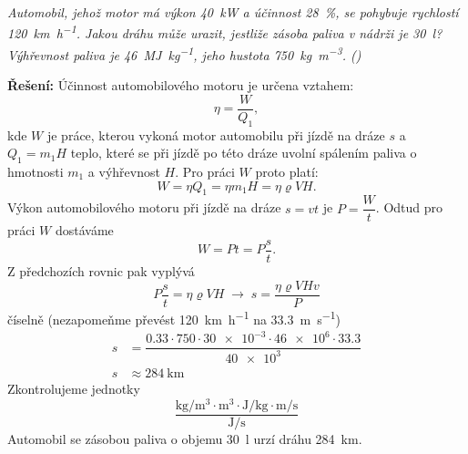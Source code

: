 \begin{mdframed}[style=mdexam]
  \begin{example}\label{FYZ:exam031}
    \emph{Automobil, jehož motor má výkon \SI{40}{\kW}  a účinnost \SI{28}{\percent}, se pohybuje
    rychlostí \SI{120}{\km\per\hour}. Jakou dráhu může urazit, jestliže zásoba paliva v nádrži je
    \SI{30}{\litre}? Výhřevnost paliva je \SI{46}{\mega\joule\per\kg}, jeho hustota
    \SI{750}{\kg\per\cubic\m}. (\cite[s.~33]{Bartuska1997})}
    
    \textbf{Řešení:}\newline 
    Účinnost automobilového motoru je určena vztahem:
    \begin{equation*}
      \eta = \dfrac{W}{Q_1},
    \end{equation*}
    kde \(W\) je práce, kterou vykoná motor automobilu při jízdě na dráze \(s\) a \(Q_1 = m_1H\)
    teplo, které se při jízdě po této dráze uvolní spálením paliva o hmotnosti \(m_1\) a výhřevnost
    \(H\). Pro práci \(W\) proto platí: 
    \begin{equation*}
     W = \eta Q_1 = \eta m_1H = \eta\varrho VH.
    \end{equation*}
    Výkon automobilového motoru při jízdě na dráze \(s = vt\) je \(P=\dfrac{W}{t}\). Odtud pro práci
    \(W\) dostáváme
    \begin{equation*}
      W = Pt = P\dfrac{s}{t}. 
    \end{equation*}
    Z předchozích rovnic pak vyplývá
    \begin{equation*}
      P\dfrac{s}{t} = \eta\varrho VH \;\rightarrow\; s = \dfrac{\eta\varrho VHv}{P}
    \end{equation*}
    číselně (nezapomeňme převést \SI{120}{\km\per\hour} na \SI{33.3}{\m\per\s})
    \begin{align*}
       s  &=\dfrac{\num{0.33}\cdot750\cdot\num{30e-3}\cdot\num{46e6}\cdot\num{33.3}}{\num{40e3}}  \\
       s  &\approx \SI{284}{\km}    
    \end{align*}
    Zkontrolujeme jednotky
    \begin{equation*}
      \dfrac{\si{\kg\per\cubic\m}\cdot\si{\cubic\m}\cdot\si{\joule\per\kg}\cdot\si{\m\per\s}}
            {\si{\joule\per\s}}  
    \end{equation*}  
    Automobil se zásobou paliva o objemu \SI{30}{\litre} urzí dráhu \SI{284}{\km}.
  \end{example} 
\end{mdframed}